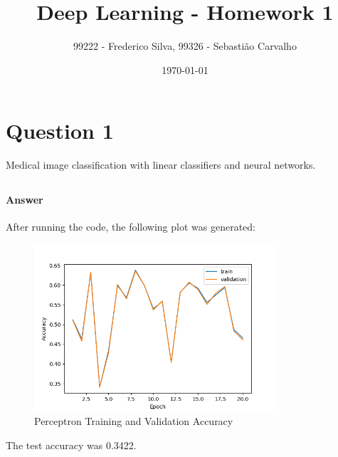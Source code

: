 \documentclass{article}
\title{Deep Learning - Homework 1}
\author{99222 - Frederico Silva, 99326 - Sebastião Carvalho}
\date{\today}
\begin{document}
\maketitle

\tableofcontents

\section{Question 1}

Medical image classification with linear classifiers and neural networks.

\subsection{}

\subsubsection{}

\paragraph{Answer} After running the code, the following plot was generated:
\begin{figure}[H]
    \centering
    \includegraphics[width=0.8\textwidth]{"plots/1_1_a.png"}
    \caption{Perceptron Training and Validation Accuracy}
    \label{1.1.a Plot}
\end{figure}

The test accuracy was 0.3422.

\subsubsection{}
\label{1.1.b}
\end{document}
